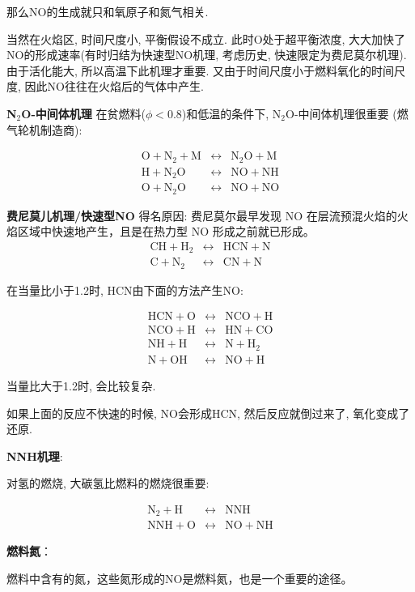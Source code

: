 \documentclass[10pt, landscape]{extarticle}
\numberwithin{equation}{section}
\begin{document}
\begin{multicols}{3}
那么NO的生成就只和氧原子和氮气相关.

当然在火焰区, 时间尺度小, 平衡假设不成立. 此时O处于超平衡浓度, 大大加快了NO的形成速率(有时归结为快速型NO机理, 考虑历史, 快速限定为费尼莫尔机理).
由于活化能大, 所以高温下此机理才重要. 又由于时间尺度小于燃料氧化的时间尺度, 因此NO往往在火焰后的气体中产生.

\textbf{N\(_2\)O-中间体机理}
在贫燃料(\(\phi<0.8\))和低温的条件下, N\(_2\)O-中间体机理很重要 (燃气轮机制造商):

\begin{eqnarray}
    \mathrm{O + N_2 + M} &\leftrightarrow& \mathrm{N_2O + M}\\
    \mathrm{H + N_2O} &\leftrightarrow& \mathrm{NO + NH}\\
    \mathrm{O + N_2O} &\leftrightarrow& \mathrm{NO + NO}
\end{eqnarray}


\textbf{费尼莫儿机理/快速型NO}
得名原因: 费尼莫尔最早发现 NO 在层流预混火焰的火焰区域中快速地产生，且是在热力型 NO 形成之前就已形成。
\begin{eqnarray}
    \mathrm{CH + H_2} &\leftrightarrow& \mathrm{HCN + N}\\
    \mathrm{C + N_2} &\leftrightarrow& \mathrm{CN + N}
\end{eqnarray}

在当量比小于1.2时, HCN由下面的方法产生NO:

\begin{eqnarray}
    \mathrm{HCN + O} &\leftrightarrow& \mathrm{NCO + H} \\
    \mathrm{NCO + H} &\leftrightarrow& \mathrm{HN + CO} \\
    \mathrm{NH + H} &\leftrightarrow& \mathrm{N + H_2} \\
    \mathrm{N + OH} &\leftrightarrow& \mathrm{NO + H}
\end{eqnarray}

当量比大于1.2时, 会比较复杂.

如果上面的反应不快速的时候, NO会形成HCN, 然后反应就倒过来了, 氧化变成了还原.

\textbf{NNH机理}: 

对氢的燃烧, 大碳氢比燃料的燃烧很重要:

\begin{eqnarray}
    \mathrm{N_2 + H} &\leftrightarrow& \mathrm{NNH}\\
    \mathrm{NNH + O} &\leftrightarrow& \mathrm{NO + NH}
\end{eqnarray}

\textbf{燃料氮}：

燃料中含有的氮，这些氮形成的NO是燃料氮，也是一个重要的途径。

\end{multicols}
\end{document}
